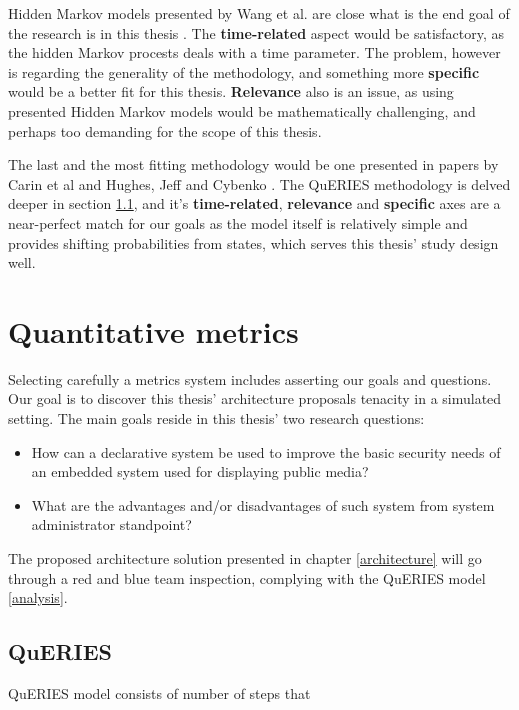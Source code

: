 Hidden Markov models presented by Wang et al. are close what is the
end goal of the research is in this thesis
\cite{wang2010framework}. The \textbf{time-related} aspect would be
satisfactory, as the hidden Markov procests deals with a time
parameter. The problem, however is regarding the generality of the
methodology, and something more \textbf{specific} would be a better
fit for this thesis. \textbf{Relevance} also is an issue, as using
presented Hidden Markov models would be mathematically challenging,
and perhaps too demanding for the scope of this thesis.

The last and the most fitting methodology would be one presented in
papers by Carin et al and Hughes, Jeff and Cybenko
\cite{carin2008cybersecurity} \cite{hughes2013quantitative}. The
QuERIES methodology is delved deeper in section \ref{queries}, and
it's \textbf{time-related}, \textbf{relevance} and \textbf{specific}
axes are a near-perfect match for our goals as the model itself is
relatively simple and provides shifting probabilities from states,
which serves this thesis' study design well.

\section{Quantitative metrics}

Selecting carefully a metrics system includes asserting our goals and
questions. Our goal is to discover this thesis' architecture proposals
tenacity in a simulated setting. The main goals reside in this thesis'
two research questions:
\begin{itemize}
\item How can a declarative system be used to improve the basic
  security needs of an embedded system used for displaying public
  media?
\item What are the advantages and/or disadvantages of such system from
  system administrator standpoint?
\end{itemize}

The proposed architecture solution presented in chapter
\ref{architecture} will go through a red and blue team inspection,
complying with the QuERIES model \ref{analysis}.

\subsection{QuERIES} \label{queries}
QuERIES model consists of number of steps that

